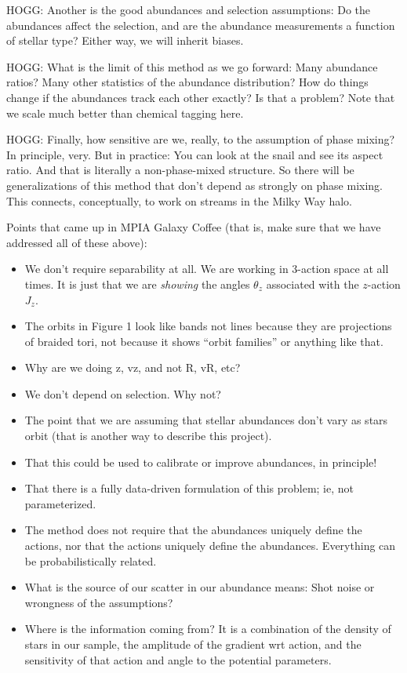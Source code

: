 \documentclass[modern]{aastex63}
\begin{document}
HOGG: Another is the good abundances and selection assumptions: Do the abundances affect
the selection, and are the abundance measurements a function of stellar type? Either way,
we will inherit biases.

HOGG: What is the limit of this method as we go forward: Many abundance ratios? Many other
statistics of the abundance distribution? How do things change if the abundances track
each other exactly? Is that a problem? Note that we scale much better than chemical tagging
here.

HOGG: Finally, how sensitive are we, really, to the assumption of
phase mixing? In principle, very. But in practice: You can look at the
snail and see its aspect ratio. And that is literally a
non-phase-mixed structure. So there will be generalizations of this
method that don't depend as strongly on phase mixing. This connects,
conceptually, to work on streams in the Milky Way halo.

Points that came up in MPIA Galaxy Coffee (that is, make sure that we
have addressed all of these above):
\begin{itemize}
\item
  We don't require separability at all. We are working in 3-action
  space at all times. It is just that we are \emph{showing} the angles
  $\theta_z$ associated with the $z$-action $J_z$.
\item
  The orbits in Figure 1 look like bands not lines because they are
  projections of braided tori, not because it shows ``orbit families''
  or anything like that.
\item
  Why are we doing z, vz, and not R, vR, etc?
\item
  We don't depend on selection. Why not?
\item
  The point that we are assuming that stellar abundances don't vary as
  stars orbit (that is another way to describe this project).
\item
  That this could be used to calibrate or improve abundances, in
  principle!
\item
  That there is a fully data-driven formulation of this problem; ie, not
  parameterized.
\item
  The method does not require that the abundances uniquely define the
  actions, nor that the actions uniquely define the
  abundances. Everything can be probabilistically related.
\item
  What is the source of our scatter in our abundance means: Shot noise
  or wrongness of the assumptions?
\item
  Where is the information coming from? It is a combination of the
  density of stars in our sample, the amplitude of the gradient wrt
  action, and the sensitivity of that action and angle to the potential
  parameters.
\end{itemize}
\end{document}
